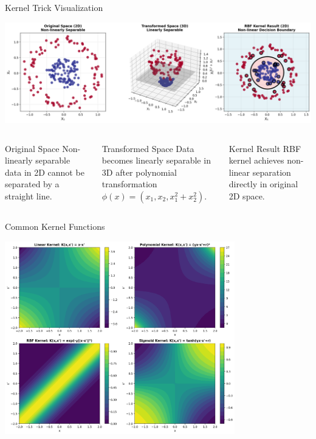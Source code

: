 \documentclass[8pt,aspectratio=1610]{beamer}
\begin{document}
\begin{frame}{Kernel Trick Visualization}
\begin{center}
\includegraphics[width=\textwidth]{../figures/kernel_trick_transformation.png}
\end{center}

\begin{columns}[t]
\begin{column}{0.32\textwidth}
\begin{alertblock}{Original Space}
Non-linearly separable data in 2D cannot be separated by a straight line.
\end{alertblock}
\end{column}

\begin{column}{0.32\textwidth}
\begin{alertblock}{Transformed Space}
Data becomes linearly separable in 3D after polynomial transformation $\phi(x) = (x_1, x_2, x_1^2 + x_2^2)$.
\end{alertblock}
\end{column}

\begin{column}{0.32\textwidth}
\begin{alertblock}{Kernel Result}
RBF kernel achieves non-linear separation directly in original 2D space.
\end{alertblock}
\end{column}
\end{columns}
\end{frame}

\begin{frame}{Common Kernel Functions}
\begin{center}
\includegraphics[width=0.75\textwidth]{../figures/kernel_functions.png}
\end{center}
\end{frame}
\end{document}
